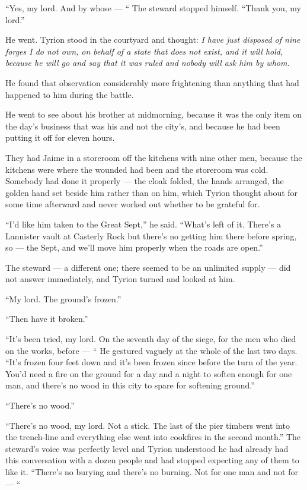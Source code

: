 “Yes, my lord. And by whose — “ The steward stopped himself. “Thank you, my lord.”

He went. Tyrion stood in the courtyard and thought: \textit{I have just disposed of nine forges I do not own, on behalf of a state that does not exist, and it will hold, because he will go and say that it was ruled and nobody will ask him by whom.}

He found that observation considerably more frightening than anything that had happened to him during the battle.

\sceneBreak

He went to see about his brother at midmorning, because it was the only item on the day’s business that was his and not the city’s, and because he had been putting it off for eleven hours.

They had Jaime in a storeroom off the kitchens with nine other men, because the kitchens were where the wounded had been and the storeroom was cold. Somebody had done it properly — the cloak folded, the hands arranged, the golden hand set beside him rather than on him, which Tyrion thought about for some time afterward and never worked out whether to be grateful for.

“I’d like him taken to the Great Sept,” he said. “What’s left of it. There’s a Lannister vault at Casterly Rock but there’s no getting him there before spring, so — the Sept, and we’ll move him properly when the roads are open.”

The steward — a different one; there seemed to be an unlimited supply — did not answer immediately, and Tyrion turned and looked at him.

“My lord. The ground’s frozen.”

“Then have it broken.”

“It’s been tried, my lord. On the seventh day of the siege, for the men who died on the works, before — “ He gestured vaguely at the whole of the last two days. “It’s frozen four feet down and it’s been frozen since before the turn of the year. You’d need a fire on the ground for a day and a night to soften enough for one man, and there’s no wood in this city to spare for softening ground.”

“There’s no wood.”

“There’s no wood, my lord. Not a stick. The last of the pier timbers went into the trench-line and everything else went into cookfires in the second month.” The steward’s voice was perfectly level and Tyrion understood he had already had this conversation with a dozen people and had stopped expecting any of them to like it. “There’s no burying and there’s no burning. Not for one man and not for — “

